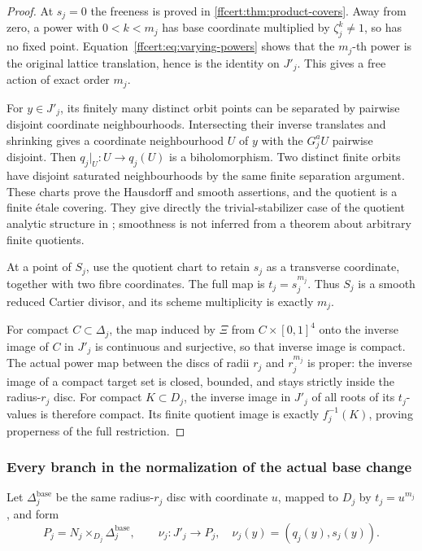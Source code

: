 \begin{proof}
At $s_j=0$ the freeness is proved in
\cref{ffcert:thm:product-covers}. Away from zero, a power with
$0<k<m_j$ has base coordinate multiplied by $\zeta_j^k\ne1$, so
has no fixed point. Equation~\eqref{ffcert:eq:varying-powers} shows
that the $m_j$-th power is the original lattice translation, hence is
the identity on $J'_j$. This gives a free action of exact order $m_j$.

For $y\in J'_j$, its finitely many distinct orbit points can be
separated by pairwise disjoint coordinate neighbourhoods. Intersecting
their inverse translates and shrinking gives a coordinate neighbourhood
$U$ of $y$ with the $G_j^aU$ pairwise disjoint. Then
$q_j|_U:U\to q_j(U)$ is a biholomorphism. Two distinct finite orbits
have disjoint saturated neighbourhoods by the same finite separation
argument. These charts prove the Hausdorff and smooth assertions, and
the quotient is a finite \'etale covering. They give directly the
trivial-stabilizer case of the quotient analytic structure in
\cite[conditions (I)--(II), Theorem~1]{Cartan1954Quotient}; smoothness
is not inferred from a theorem about arbitrary finite quotients.

At a point of $S_j$, use the quotient chart to retain $s_j$ as a
transverse coordinate, together with two fibre coordinates. The full
map is $t_j=s_j^{m_j}$. Thus $S_j$ is a smooth reduced Cartier
divisor, and its scheme multiplicity is exactly $m_j$.

For compact $C\subset\Delta_j$, the map induced by $\Xi$ from
$C\times[0,1]^4$ onto the inverse image of $C$ in $J'_j$ is
continuous and surjective, so that inverse image is compact. The actual
power map between the discs of radii $r_j$ and $r_j^{m_j}$ is proper:
the inverse image of a compact target set is closed, bounded, and stays
strictly inside the radius-$r_j$ disc. For compact $K\subset D_j$,
the inverse image in $J'_j$ of all roots of its $t_j$-values is
therefore compact. Its finite quotient image is exactly $f_j^{-1}(K)$,
proving properness of the full restriction.
\end{proof}

\subsubsection{Every branch in the normalization of the actual base change}

Let $\Delta_j^{\mathrm{base}}$ be the same radius-$r_j$ disc with
coordinate $u$, mapped to $D_j$ by $t_j=u^{m_j}$, and form
\[
 P_j=N_j\times_{D_j}\Delta_j^{\mathrm{base}},\qquad
 \nu_j:J'_j\longrightarrow P_j,\quad
 \nu_j(y)=(q_j(y),s_j(y)).
 \tag{FF26}\label{ffcert:eq:normalization-map}
\]

